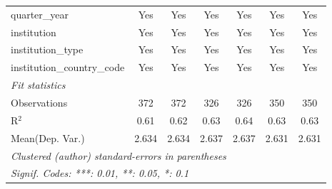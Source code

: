 \begin{tabular}{lcccccc}
   quarter\_year                      & Yes     & Yes     & Yes     & Yes     & Yes     & Yes\\  
   institution                        & Yes     & Yes     & Yes     & Yes     & Yes     & Yes\\  
   institution\_type                  & Yes     & Yes     & Yes     & Yes     & Yes     & Yes\\  
   institution\_country\_code         & Yes     & Yes     & Yes     & Yes     & Yes     & Yes\\  
   \midrule
   \emph{Fit statistics}\\
   Observations                       & 372     & 372     & 326     & 326     & 350     & 350\\  
   R$^2$                              & 0.61    & 0.62    & 0.63    & 0.64    & 0.63    & 0.63\\  
Mean(Dep. Var.) & 2.634 & 2.634 & 2.637 & 2.637 & 2.631 & 2.631 \\
   \midrule \midrule
   \multicolumn{7}{l}{\emph{Clustered (author) standard-errors in parentheses}}\\
   \multicolumn{7}{l}{\emph{Signif. Codes: ***: 0.01, **: 0.05, *: 0.1}}\\
\end{tabular}
\par\endgroup
